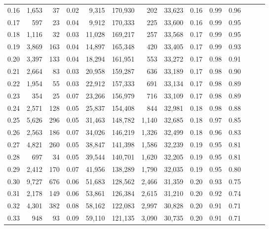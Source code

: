 \begin{tabular}{rrrrrrrrrrrrrr}
0.16 &   1,653 &     37 &  0.02 &    9,315 &  170,930 &     202 &  33,623 &  0.16 &  0.99 &      0.96 \\
0.17 &     597 &     23 &  0.04 &    9,912 &  170,333 &     225 &  33,600 &  0.16 &  0.99 &      0.95 \\
0.18 &   1,116 &     32 &  0.03 &   11,028 &  169,217 &     257 &  33,568 &  0.17 &  0.99 &      0.95 \\
0.19 &   3,869 &    163 &  0.04 &   14,897 &  165,348 &     420 &  33,405 &  0.17 &  0.99 &      0.93 \\
0.20 &   3,397 &    133 &  0.04 &   18,294 &  161,951 &     553 &  33,272 &  0.17 &  0.98 &      0.91 \\
0.21 &   2,664 &     83 &  0.03 &   20,958 &  159,287 &     636 &  33,189 &  0.17 &  0.98 &      0.90 \\
0.22 &   1,954 &     55 &  0.03 &   22,912 &  157,333 &     691 &  33,134 &  0.17 &  0.98 &      0.89 \\
0.23 &     354 &     25 &  0.07 &   23,266 &  156,979 &     716 &  33,109 &  0.17 &  0.98 &      0.89 \\
0.24 &   2,571 &    128 &  0.05 &   25,837 &  154,408 &     844 &  32,981 &  0.18 &  0.98 &      0.88 \\
0.25 &   5,626 &    296 &  0.05 &   31,463 &  148,782 &   1,140 &  32,685 &  0.18 &  0.97 &      0.85 \\
0.26 &   2,563 &    186 &  0.07 &   34,026 &  146,219 &   1,326 &  32,499 &  0.18 &  0.96 &      0.83 \\
0.27 &   4,821 &    260 &  0.05 &   38,847 &  141,398 &   1,586 &  32,239 &  0.19 &  0.95 &      0.81 \\
0.28 &     697 &     34 &  0.05 &   39,544 &  140,701 &   1,620 &  32,205 &  0.19 &  0.95 &      0.81 \\
0.29 &   2,412 &    170 &  0.07 &   41,956 &  138,289 &   1,790 &  32,035 &  0.19 &  0.95 &      0.80 \\
0.30 &   9,727 &    676 &  0.06 &   51,683 &  128,562 &   2,466 &  31,359 &  0.20 &  0.93 &      0.75 \\
0.31 &   2,178 &    149 &  0.06 &   53,861 &  126,384 &   2,615 &  31,210 &  0.20 &  0.92 &      0.74 \\
0.32 &   4,301 &    382 &  0.08 &   58,162 &  122,083 &   2,997 &  30,828 &  0.20 &  0.91 &      0.71 \\
0.33 &     948 &     93 &  0.09 &   59,110 &  121,135 &   3,090 &  30,735 &  0.20 &  0.91 &      0.71 \\

\end{tabular}
